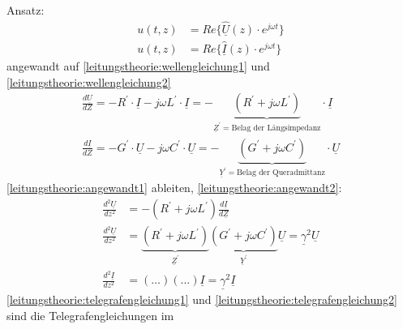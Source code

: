 Ansatz:
\begin{align}
	u(t,z) &= Re \{ \underline{\hat U}(z)\cdot e^{j\omega t} \} \nonumber\\
	u(t,z) &= Re \{ \underline{\hat I}(z)\cdot e^{j\omega t} \} \nonumber
\end{align}
angewandt auf \ref{leitungstheorie:wellengleichung1} und
\ref{leitungstheorie:wellengleichung2}\\
\begin{align}
	\frac{d\underline{U}}{dZ}=-R^\prime\cdot\underline{I}-j\omega
	L^\prime\cdot\underline{I}=- \underbrace{\left(R^\prime+j\omega
	L^\prime\right)}_{\underline{Z}^\prime=\text{Belag der
	Längsimpedanz}}\cdot\underline{I}\label{leitungstheorie:angewandt1}\\
	\frac{d\underline{I}}{dZ}=-G^\prime\cdot\underline{U}-j\omega
	C^\prime\cdot\underline{U}=- \underbrace{\left(G^\prime+j\omega
	C^\prime\right)}_{\underline{Y}^\prime=\text{Belag der
	Queradmittanz}}\cdot\underline{U}\label{leitungstheorie:angewandt2}
\end{align}
\ref{leitungstheorie:angewandt1} ableiten, \ref{leitungstheorie:angewandt2}:
\begin{align}
	\frac{d^2\underline{U}}{dz^2}&=-\left(R^\prime+j\omega
	L^\prime\right)\frac{d\underline{I}}{d\underline{Z}}\nonumber\\
	\frac{d^2\underline{U}}{dz^2}&=\underbrace{\left(R^\prime+j\omega
	L^\prime\right)}_{\underline{Z}^\prime}\underbrace{\left(G^\prime+j\omega
	C^\prime\right)}_{\underline{Y}^\prime}\underline{U}=\underline{\gamma}^2\underline{U}\label{leitungstheorie:telegrafengleichung1}\\
	\frac{d^2\underline{I}}{dz^2}&=\left(\ldots\right)\left(\ldots\right)\underline{I}=\underline{\gamma}^2\underline{I}\label{leitungstheorie:telegrafengleichung2}
\end{align}
\ref{leitungstheorie:telegrafengleichung1} und
\ref{leitungstheorie:telegrafengleichung2} sind die Telegrafengleichungen im
